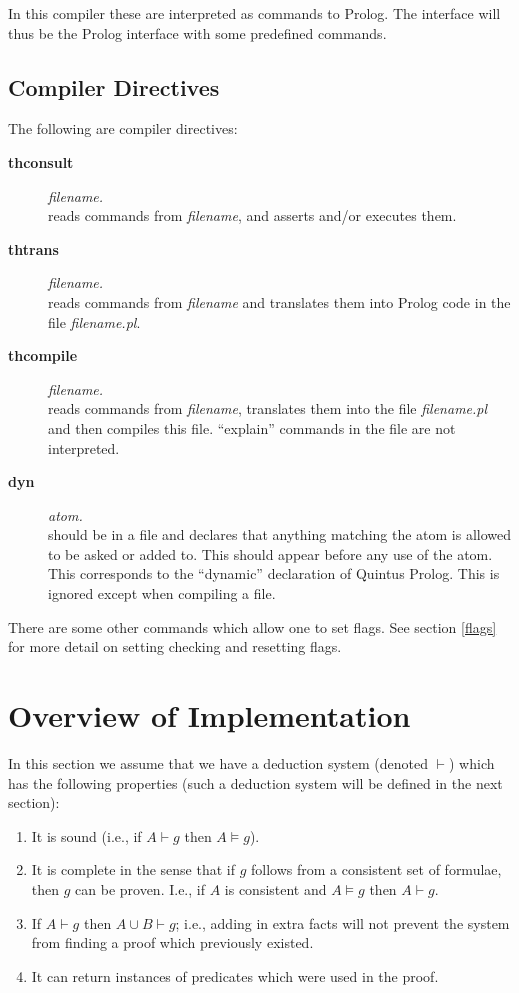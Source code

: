In this compiler these are interpreted as commands to Prolog.
The interface will thus be the Prolog interface with some predefined
commands.

\subsection{Compiler Directives}
The following are compiler directives:
\begin{description}
\item[\bf thconsult] {\em filename.}\\
reads commands from {\em filename}, and asserts and/or executes them.
\item[\bf thtrans] {\em filename.}\\
reads commands from {\em filename} and translates them into Prolog
code in the file {\em filename.pl}.
\item[\bf thcompile] {\em filename.}\\
reads commands from {\em filename}, translates them into the file
{\em filename.pl} and then compiles this file. ``explain'' commands in
the file are not interpreted.
\item[\bf dyn] {\em atom.}\\
should be in a file and declares that anything matching the atom
is allowed to be asked or added to. This should appear before any
use of the atom. This corresponds to the ``dynamic'' declaration of
Quintus Prolog. This is ignored except when compiling a file.
\end{description}
There are some other commands which allow one to set flags. See section
\ref{flags} for more detail on setting checking and resetting flags.

\section{Overview of Implementation}
In this section we assume that we have a deduction system 
(denoted $\vdash$) which has the 
following properties (such a deduction system will be defined in the
next section):
\begin{enumerate}
\item It is sound (i.e., if $A\vdash g$ then $A\models g$).
\item It is complete in the sense that if $g$ follows from a consistent
set of formulae, then $g$ can be proven. I.e., if $A$ is consistent and
$A\models g$ then $A\vdash g$.
\item If $A\vdash g$ then $A\cup B\vdash g$; i.e., adding in extra facts will
not prevent the system from finding a proof which previously existed.
\item It can return instances of predicates which were used in the proof.
\end{enumerate}

